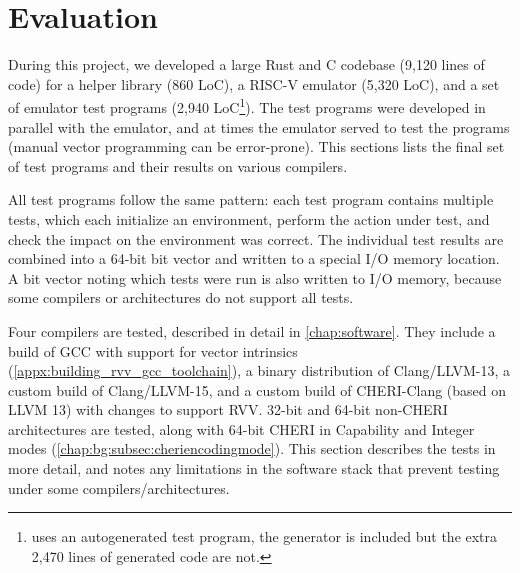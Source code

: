 \documentclass[../thesis]{subfiles}
\begin{document}
\chapter{Evaluation\label{chap:eval}}
During this project, we developed a large Rust and C codebase (9,120 lines of code) for a helper library (860 LoC), a RISC-V emulator (5,320 LoC), and a set of emulator test programs (2,940 LoC\footnote{ uses an autogenerated test program, the generator is included but the extra 2,470 lines of generated code are not.}).
The test programs were developed in parallel with the emulator, and at times the emulator served to test the programs (manual vector programming can be error-prone).
This sections lists the final set of test programs and their results on various compilers.

All test programs follow the same pattern: each test program contains multiple tests, which each initialize an environment, perform the action under test, and check the impact on the environment was correct.
The individual test results are combined into a 64-bit bit vector and written to a special I/O memory location.
A bit vector noting which tests were run is also written to I/O memory, because some compilers or architectures do not support all tests.

Four compilers are tested, described in detail in \cref{chap:software}.
They include a build of GCC with support for vector intrinsics (\cref{appx:building_rvv_gcc_toolchain}), a binary distribution of Clang/LLVM-13, a custom build of Clang/LLVM-15, and a custom build of CHERI-Clang (based on LLVM 13) with changes to support RVV.
32-bit and 64-bit non-CHERI architectures are tested, along with 64-bit CHERI in Capability and Integer modes (\cref{chap:bg:subsec:cheriencodingmode}).
This section describes the tests in more detail, and notes any limitations in the software stack that prevent testing under some compilers/architectures.

\end{document}
